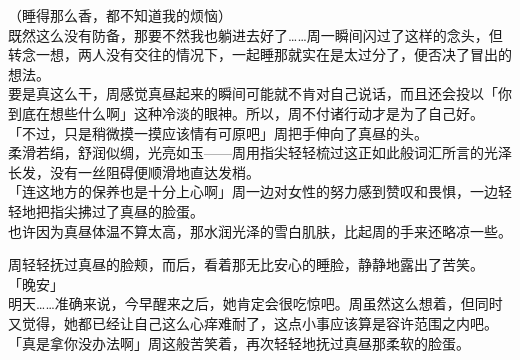 （睡得那么香，都不知道我的烦恼）\\

既然这么没有防备，那要不然我也躺进去好了……周一瞬间闪过了这样的念头，但转念一想，两人没有交往的情况下，一起睡那就实在是太过分了，便否决了冒出的想法。\\

要是真这么干，周感觉真昼起来的瞬间可能就不肯对自己说话，而且还会投以「你到底在想些什么啊」这种冷淡的眼神。所以，周不付诸行动才是为了自己好。\\

「不过，只是稍微摸一摸应该情有可原吧」周把手伸向了真昼的头。\\

柔滑若绢，舒润似绸，光亮如玉——周用指尖轻轻梳过这正如此般词汇所言的光泽长发，没有一丝阻碍便顺滑地直达发梢。\\

「连这地方的保养也是十分上心啊」周一边对女性的努力感到赞叹和畏惧，一边轻轻地把指尖拂过了真昼的脸蛋。\\

也许因为真昼体温不算太高，那水润光泽的雪白肌肤，比起周的手来还略凉一些。

周轻轻抚过真昼的脸颊，而后，看着那无比安心的睡脸，静静地露出了苦笑。\\

「晚安」\\

明天……准确来说，今早醒来之后，她肯定会很吃惊吧。周虽然这么想着，但同时又觉得，她都已经让自己这么心痒难耐了，这点小事应该算是容许范围之内吧。\\

「真是拿你没办法啊」周这般苦笑着，再次轻轻地抚过真昼那柔软的脸蛋。
